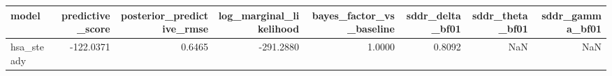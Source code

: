 \begin{tabular}{lrrrrrrr}
\toprule
model & predictive\_score & posterior\_predictive\_rmse & log\_marginal\_likelihood & bayes\_factor\_vs\_baseline & sddr\_delta\_bf01 & sddr\_theta\_bf01 & sddr\_gamma\_bf01 \\
\midrule
hsa\_steady & -122.0371 & 0.6465 & -291.2880 & 1.0000 & 0.8092 & NaN & NaN \\
\bottomrule
\end{tabular}
